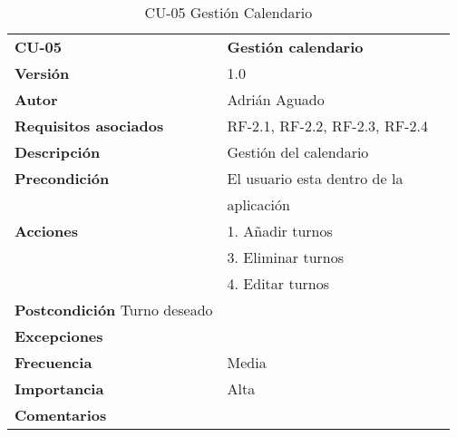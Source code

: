 \begin{table}
\begin{tabular}{llr}  
\toprule
\begin{minipage}[b]{0.24\columnwidth}\raggedright\strut
\textbf{CU-05}\strut
\end{minipage} & \begin{minipage}[b]{0.72\columnwidth}\raggedright\strut
\textbf{Gestión calendario}\strut
\end{minipage}\tabularnewline
\cmidrule(r){1-2}
\textbf{Versión}       & 1.0           \\
\textbf{Autor}       & Adrián  Aguado    \\
\textbf{Requisitos asociados}       & RF-2.1, RF-2.2, RF-2.3, RF-2.4  \\ 
\textbf{Descripción} & Gestión del calendario\\
\textbf{Precondición} & El usuario esta dentro de la \\
& aplicación       \\
\textbf{Acciones} & 1. Añadir turnos \\
& 3. Eliminar turnos \\
& 4. Editar turnos \\
\textbf{Postcondición} Turno deseado \\
\textbf{Excepciones} &     \\
\textbf{Frecuencia} & Media          \\
\textbf{Importancia} & Alta            \\
\textbf{Comentarios } &      \\
\bottomrule
\end{tabular}
\caption{CU-05 Gestión Calendario} 
\end{table}


